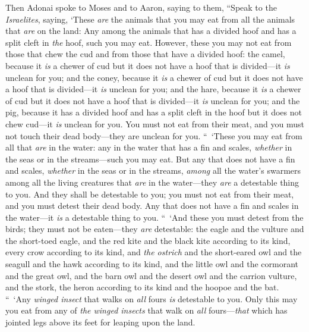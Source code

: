 \begin{biblechapter} %
 Then Adonai spoke to Moses and to Aaron, saying to them,
\verse “Speak to the \textit{Israelites}, saying, ‘These \textit{are} the animals that you may eat from all the animals that \textit{are} on the land:
\verse Any among the animals that has a divided hoof and has a split cleft in \textit{the} hoof, such you may eat.
\verse However, these you may not eat from those that chew the cud and from those that have a divided hoof: the camel, because it \textit{is} a chewer of cud but it does not have a hoof that is divided—it \textit{is} unclean for you;
\verse and the coney, because it \textit{is} a chewer of cud but it does not have a hoof that is divided—it \textit{is} unclean for you;
\verse and the hare, because it \textit{is} a chewer of cud but it does not have a hoof that is divided—it \textit{is} unclean for you;
\verse and the pig, because it has a divided hoof and has a split cleft in the hoof but it does not chew cud—it \textit{is} unclean for you.
\verse You must not eat from their meat, and you must not touch their dead body—they are unclean for you.
\verse “ ‘These you may eat from all that \textit{are} in the water: any in the water that has a fin and scales, \textit{whether} in the seas or in the streams—such you may eat.
\verse But any that does not have a fin and scales, \textit{whether} in the seas or in the streams, \textit{among} all the water’s swarmers among all the living creatures that \textit{are} in the water—they \textit{are} a detestable thing to you.
\verse And they shall be detestable to you; you must not eat from their meat, and you must detest their dead body.
\verse Any that does not have a fin and scales in the water—it \textit{is} a detestable thing to you.
\verse “ ‘And these you must detest from the birds; they must not be eaten—they \textit{are} detestable: the eagle and the vulture and the short-toed eagle,
\verse and the red kite and the black kite according to its kind,
\verse every crow according to its kind,
\verse and \textit{the ostrich} and the short-eared owl and the seagull and the hawk according to its kind,
\verse and the little owl and the cormorant and the great owl,
\verse and the barn owl and the desert owl and the carrion vulture,
\verse and the stork, the heron according to its kind and the hoopoe and the bat.
\verse “ ‘Any \textit{winged insect} that walks on \textit{all} fours \textit{is} detestable to you.
\verse Only this may you eat from any of \textit{the winged insects} that walk on \textit{all} fours—\textit{that} which has jointed legs above its feet for leaping upon the land.

\end{biblechapter}
